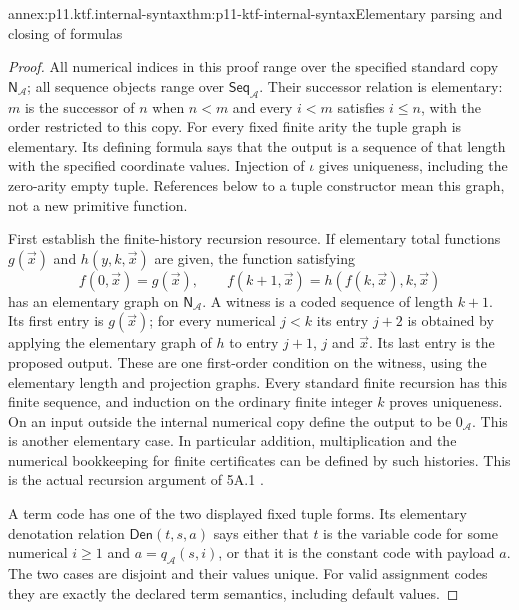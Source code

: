 \begin{annexitem}{annex:p11.ktf.internal-syntax}{thm:p11-ktf-internal-syntax}{Elementary parsing and closing of formulas}
\begin{proof}
All numerical indices in this proof range over the specified standard
copy \(\mathsf N_{\mathcal A}\); all sequence objects range over
\(\mathsf{Seq}_{\mathcal A}\). Their successor relation is
elementary: \(m\) is the successor of \(n\) when \(n<m\)
and every \(i<m\) satisfies \(i\leq n\), with the order
restricted to this copy. For every fixed finite arity the tuple graph
is elementary. Its defining formula says that the output is a sequence
of that length with the specified coordinate values. Injection of
\(\iota\) gives uniqueness, including the zero-arity empty tuple.
References below to a tuple constructor mean this graph, not a new
primitive function.

First establish the finite-history recursion resource. If elementary
total functions \(g(\vec x)\) and \(h(y,k,\vec x)\) are given,
the function satisfying
\[
 f(0,\vec x)=g(\vec x),\qquad
 f(k+1,\vec x)=h(f(k,\vec x),k,\vec x)
\]
has an elementary graph on \(\mathsf N_{\mathcal A}\).
A witness is a coded sequence of length \(k+1\). Its first
entry is \(g(\vec x)\); for every numerical \(j<k\) its
entry \(j+2\) is obtained by applying the elementary graph of
\(h\) to entry \(j+1\), \(j\) and \(\vec x\).
Its last entry is the proposed output. These are one first-order
condition on the witness, using the elementary length and projection
graphs. Every standard finite recursion has this finite sequence,
and induction on the ordinary finite integer \(k\) proves
uniqueness. On an input outside the internal numerical copy define
the output to be \(0_{\mathcal A}\). This is another elementary
case. In particular addition, multiplication and the numerical
bookkeeping for finite certificates can be defined by such histories.
This is the actual recursion argument of 5A.1
\cite[pp.~65--66]{Moschovakis1974EIASOriginal}.

A term code has one of the two displayed fixed tuple forms. Its
elementary denotation relation \(\mathsf{Den}(t,s,a)\) says
either that \(t\) is the variable code for some numerical
\(i\geq1\) and \(a=q_{\mathcal A}(s,i)\), or that it
is the constant code with payload \(a\). The two cases are
disjoint and their values unique. For valid assignment codes they
are exactly the declared term semantics, including default values.


\end{proof}
\end{annexitem}
